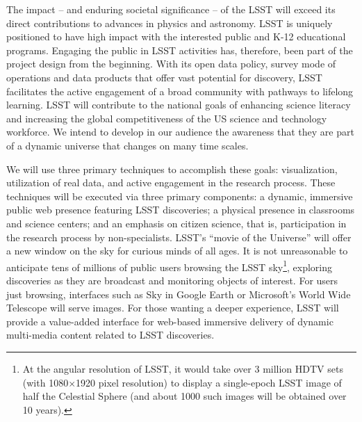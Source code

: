 \documentclass{emulateapj}
\newcommand{\B}[1]{{#1}}
\begin{document}
\B{
The impact -- and enduring societal significance -- of the LSST will exceed its direct contributions 
to advances in physics and astronomy.  LSST is uniquely positioned to have high impact with the interested 
public and K-12 educational programs. Engaging the public in LSST activities has, therefore, been part of 
the project design from the beginning. 
With its open data policy, survey mode of operations and 
data products that offer vast potential for discovery, LSST facilitates the active engagement of a 
broad community with pathways to lifelong learning.  LSST will contribute to the national goals of 
enhancing science literacy and increasing the global competitiveness of the US science and technology 
workforce.  We intend to develop in our audience the awareness that they are part of a dynamic universe 
that changes on many time scales.  

We will use three primary techniques to accomplish these goals: visualization, utilization of real data, 
and active engagement in the research process. These techniques will be executed via three primary components: 
a dynamic, immersive public web presence featuring LSST discoveries; a physical presence in classrooms 
and science centers; and an emphasis on citizen science, that is, participation in the research process by 
non-specialists.  LSST's ``movie of the Universe'' will offer a new window on the sky for curious minds of 
all ages.  It is not unreasonable to anticipate tens of millions of public users browsing the LSST 
sky\footnote{At the angular resolution of LSST, it would take over 3 million  HDTV sets (with 1080$\times$1920 
pixel resolution) to display a single-epoch  LSST image of half the Celestial Sphere (and about 1000 such 
images will be  obtained over 10 years).}, exploring discoveries as they are broadcast and monitoring objects 
of interest.  For users just browsing, interfaces such as Sky in Google Earth or Microsoft's World Wide Telescope 
will serve images.  For those wanting a deeper experience, LSST will provide a value-added interface for 
web-based immersive delivery of dynamic multi-media content related to LSST discoveries.

}
\end{document}
